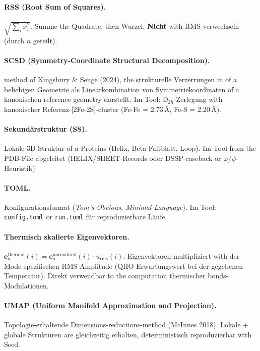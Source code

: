 \documentclass[11pt,a4paper,twoside]{article}
\providecommand{\angstrom}{\text{\AA}}    %
\theoremstyle{remark}
\begin{document}
\paragraph{RSS (Root Sum of Squares).}
$\sqrt{\sum_i x_i^2}$. Summe the Quadrate, then Wurzel.
\textbf{Nicht} with RMS verwechseln (durch $n$ geteilt).

\paragraph{SCSD (Symmetry-Coordinate Structural Decomposition).}
method of Kingsbury \& Senge (2024), the strukturelle
Verzerrungen in of a beliebigen Geometrie als Linearkombination
von Symmetriekoordinaten of a kanonischen reference geometry
darstellt. Im Tool: D$_{2h}$-Zerlegung with kanonischer
Referenz-[2Fe-2S]-cluster (Fe-Fe = 2.73\,$\angstrom$,
Fe-S = 2.20\,$\angstrom$).

\paragraph{Sekund\"arstruktur (SS).}
Lokale 3D-Struktur of a Proteins (Helix, Beta-Faltblatt, Loop).
Im Tool from the PDB-File abgeleitet (HELIX/SHEET-Records oder
DSSP-caseback or $\varphi/\psi$-Heuristik).

\paragraph{TOML.}
Konfigurationsformat (\emph{Tom's Obvious, Minimal Language}).
Im Tool: \texttt{config.toml} or \texttt{run.toml} f\"ur
reproduzierbare L\"aufe.

\paragraph{Thermisch skalierte Eigenvektoren.}
$\mathbf{e}_a^\text{thermal}(i) = \mathbf{e}_a^\text{normalized}(i)
\cdot u_\text{rms}(i)$. Eigenvektoren multipliziert with der
Mode-spezifischen RMS-Amplitude (QHO-Erwartungswert bei der
gegebenen Temperatur). Direkt verwendbar to the computation
thermischer bonds-Modulationen.

\paragraph{UMAP (Uniform Manifold Approximation and Projection).}
Topologie-erhaltende Dimensions-reductions-method (McInnes 2018).
Lokale + globale Strukturen are gleichzeitig erhalten,
deterministisch reproduzierbar with Seed.
\end{document}
